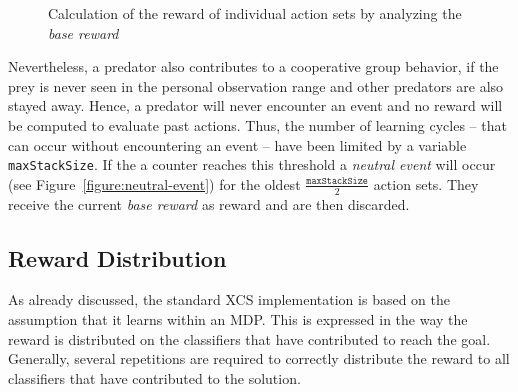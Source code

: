 \documentclass{sig-alternate}
\begin{document}
\begin{figure}[ht]
  \hfill
  \hfill
	\caption{Calculation of the reward of individual action sets by analyzing the \emph{base reward}}
	\label{figure:experiment}
\end{figure}

Nevertheless, a predator also contributes to a cooperative group behavior, if the prey is never seen in the personal observation range and other predators are also stayed away. Hence, a predator will never encounter an event and no reward will be computed to evaluate past actions. Thus, the number of learning cycles -- that can occur without encountering an event -- have been limited by a variable \verb|maxStackSize|. If the a counter reaches this threshold a \emph{neutral event} will occur (see Figure~\ref{figure:neutral-event}) for the oldest $\frac{\texttt{maxStackSize}}{2}$ action sets. They receive the current \emph{base reward} as reward and are then discarded.

\subsection{Reward Distribution}
\label{subsection:reward-distribution}

As already discussed, the standard XCS implementation is based on the assumption that it learns within an MDP. This is expressed in the way the reward is distributed on the classifiers that have contributed to reach the goal. Generally, several repetitions are required to correctly distribute the reward to all classifiers that have contributed to the solution.
\end{document}

